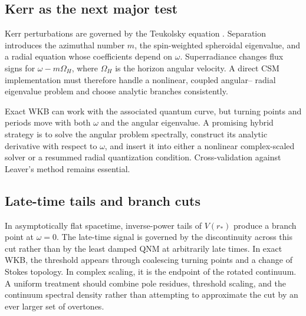 \subsection{Kerr as the next major test}
\label{subsec:kerr-outlook}

Kerr perturbations are governed by the Teukolsky equation
\cite{Teukolsky:1972my}.  Separation introduces the azimuthal number $m$, the
spin-weighted spheroidal eigenvalue, and a radial equation whose coefficients
depend on $\omega$.  Superradiance changes flux signs for
$\omega-m\Omega_H$, where $\Omega_H$ is the horizon angular velocity.  A
direct CSM implementation must therefore handle a nonlinear, coupled angular--
radial eigenvalue problem and choose analytic branches consistently.

Exact WKB can work with the associated quantum curve, but turning points and
periods move with both $\omega$ and the angular eigenvalue.  A promising
hybrid strategy is to solve the angular problem spectrally, construct its
analytic derivative with respect to $\omega$, and insert it into either a
nonlinear complex-scaled solver or a resummed radial quantization condition.
Cross-validation against Leaver's method remains essential.

\subsection{Late-time tails and branch cuts}
\label{subsec:bh-tails}

In asymptotically flat spacetime, inverse-power tails of $V(r_*)$ produce a
branch point at $\omega=0$.  The late-time signal is governed by the
discontinuity across this cut rather than by the least damped QNM at arbitrarily
late times.  In exact WKB, the threshold appears through coalescing turning
points and a change of Stokes topology.  In complex scaling, it is the endpoint
of the rotated continuum.  A uniform treatment should combine pole residues,
  threshold scaling, and the continuum spectral density rather than attempting
  to approximate the cut by an ever larger set of overtones.
